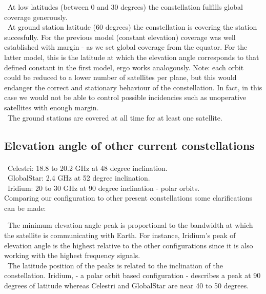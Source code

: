 \textendash\  At low latitudes (between 0 and 30 degrees) the constellation fulfills global coverage generously. \\

\textendash\ At ground station latitude (60 degrees) the constellation is covering the station succesfully. For the previous model (constant elevation) coverage was well established with margin - as we set global coverage from the equator. For the latter model, this is the latitude at which the elevation angle corresponds to that defined constant in the first model, ergo works analogously. Note: each orbit could be reduced to a lower number of satellites per plane, but this would endanger the correct and stationary behaviour of the constellation. In fact, in this case we would not be able to control possible incidencies such as unoperative satellites with enough margin. \\

\textendash\ The ground stations are covered at all time for at least one satellite.\\

\subsection{Elevation angle of other current constellations}

\paragraph{}

\textendash\ Celestri: 18.8 to 20.2 GHz at 48 degree inclination.\\
\textendash\ GlobalStar: 2.4 GHz at 52 degree inclination.\\
\textendash\ Iridium: 20 to 30 GHz at 90 degree inclination - polar orbits.\\

Comparing our configuration to other present constellations some clarifications can be made: 

\textendash\ The minimum elevation angle peak is proportional to the bandwidth at which the satellite is communicating with Earth. For instance, Iridium's peak of elevation angle is the highest relative to the other configurations since it is also working with the highest frequency signals. \\

\textendash\ The latitude position of the peaks is related to the inclination of the constellation. Iridium, - a polar orbit based configuration - describes a peak at 90 degrees of latitude whereas Celestri and GlobalStar are near 40 to 50 degrees. \\

